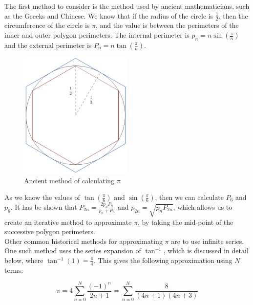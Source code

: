 The first method to consider is the method used by ancient mathematicians, such as the Greeks and Chinese\cite{ART_ArchPi}\cite[][106]{BOK_CalcBook}. We know that if the radius of the circle is \(\frac{1}{2}\), then the circumference of the circle is \(\pi\), and the value is between the perimeters of the inner and outer polygon perimeters. The internal perimeter is \(p_n = n\sin(\frac{\pi}{n})\) and the external perimeter is \(P_n = n\tan(\frac{\pi}{n})\).\\

\begin{figure}[!ht]
	\label{FIG_"Pi Diagram 1"}
	\caption{Ancient method of calculating \(\pi\)}
	\centering
	\includegraphics[width=0.5\textwidth]{"./Diagrams/Pi Diagram 1"}
\end{figure}

As we know the values of \(\tan(\frac{\pi}{6})\) and \(\sin(\frac{\pi}{6})\), then we can calculate \(P_6\) and \(p_6\). It has be shown that \(P_{2n} = \frac{2p_nP_n}{p_n + P_n}\) and \(p_{2n} = \sqrt{p_nP_{2n}}\)\cite{BOK_HistMat}, which allows us to create an iterative method to approximate \(\pi\), by taking the mid-point of the successive polygon perimeters.\\

Other common historical methods for approximating \(\pi\) are to use infinite series. One such method uses the series expansion of \(\tan^{-1}\), which is discussed in detail below, where \(\tan^{-1}(1) = \frac{\pi}{4}\). This gives the following approximation using \(N\) terms:

\begin{equation}
\label{EQN_"Tan pi Series"}
\pi = 4\sum_{n=0}^{N} \frac{(-1)^n}{2n+1} = \sum_{n=0}^N \frac{8}{(4n+1)(4n+3)}
\end{equation}

